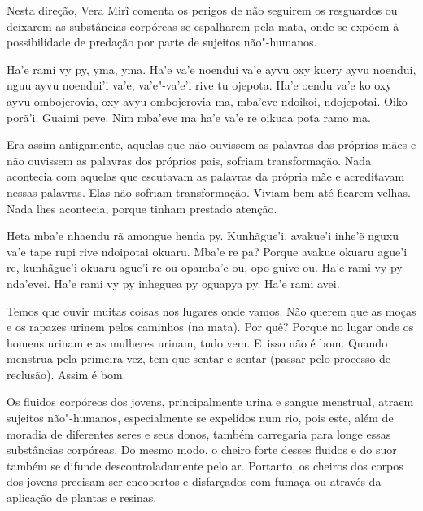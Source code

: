 Nesta direção, Vera Mirĩ comenta os perigos de não seguirem os
resguardos ou deixarem as substâncias corpóreas se espalharem pela
mata, onde se expõem à possibilidade de predação por parte de sujeitos
não"-humanos. 

\bigskip

\begin{paracol}{2}
\footnotesize
Ha’e rami vy py, yma, yma. Ha’e va’e noendui va’e ayvu oxy kuery ayvu
noendui, nguu ayvu noendui’i va’e, va’e"-va’e’i rive tu ojepota. Ha’e
oendu va’e ko oxy ayvu ombojerovia, oxy avyu ombojerovia ma, mba’eve
ndoikoi, ndojepotai. Oiko porã’i. Guaimi peve. Nim mba’eve ma ha’e va’e
re oikuaa pota ramo ma. 

\switchcolumn
Era assim antigamente, aquelas que não ouvissem as palavras das próprias
mães e não ouvissem as palavras dos próprios pais, sofriam
transformação. Nada acontecia com aquelas que escutavam as palavras da
própria mãe e acreditavam nessas palavras. Elas não sofriam
transformação. Viviam bem até ficarem velhas. Nada lhes acontecia,
porque tinham prestado atenção. 

\switchcolumn
Heta mba'e nhaendu rã amongue henda py. Kunhãgue'i, avakue'i inhe'ẽ
nguxu va'e tape rupi rive ndoipotai okuaru. Mba'e re pa? Porque avakue
okuaru ague'i re, kunhãgue'i okuaru ague'i re ou opamba'e ou, opo guive
ou. Ha'e rami vy py nda'evei. Ha'e rami vy py inheguea py oguapya py.
Ha'e rami avei.

\switchcolumn
Temos que ouvir muitas coisas nos lugares onde vamos. Não querem que as
moças e os rapazes urinem pelos caminhos (na mata). Por quê? Porque no
lugar onde os homens urinam e as mulheres urinam, tudo
vem\footnotemark{}. E~isso não é bom. Quando menstrua pela primeira
vez, tem que sentar e sentar (passar pelo processo de reclusão). Assim
é bom.
\end{paracol}

\bigskip

Os fluidos corpóreos dos jovens, principalmente urina e sangue
menstrual, atraem sujeitos não"-humanos, especialmente se expelidos num
rio, pois este, além de moradia de diferentes seres e seus donos,
também carregaria para longe essas substâncias corpóreas. Do mesmo
modo, o cheiro forte desses fluidos e do suor também se difunde
descontroladamente pelo ar. Portanto, os cheiros dos corpos dos jovens
precisam ser encobertos e disfarçados com fumaça ou através da
aplicação de plantas e resinas. 


